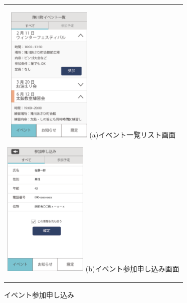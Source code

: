 \begin{figure}[htbp]
  \begin{center}
    \begin{tabular}{c}

      \begin{minipage}{0.33\hsize}
        \begin{center}
\includegraphics[width=4cm]{event_list_town.png}
          \hspace{1cm} %
          {\footnotesize (a)イベント一覧リスト画面}
        \end{center}
      \end{minipage}

      \begin{minipage}{0.33\hsize}
        \begin{center}
\includegraphics[width=4cm]{participant_form}
          \hspace{1cm}%
          {\footnotesize (b)イベント参加申し込み画面}
        \end{center}
      \end{minipage}

    \end{tabular}
    \caption{イベント参加申し込み}
    \label{fig:lena}
  \end{center}
\end{figure}

